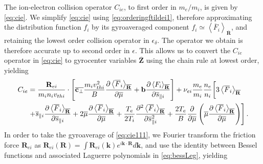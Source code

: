 
The ion-electron collision operator $C_{ie}$, to first order in $m_e/m_i$, is given by \cref{eq:cie}.
%
We simplify \cref{eq:cie} using \cref{eq:orderingftildei1}, therefore approximating the distribution function $f_i$ by its gyroaveraged component $f_i \simeq \left<\overline F_i\right>_{\overline{\mathbf R}}$, and retaining the lowest order collision operator in $\epsilon_\delta$.
%
The operator we obtain is therefore accurate up to second order in $\epsilon$. 
%
This allows us to convert the $C_{ie}$ operator in \cref{eq:cie} to gyrocenter variables $\overline{\mathbf Z}$ using the chain rule at lowest order, yielding
%
\begin{align}
    C_{ie} &= \frac{\mathbf R_{ei}}{m_i n_i v_{th i }}\cdot\left[\overline {\mathbf c_\perp} \frac{m_i v_{thi}^2}{B}\frac{\partial \left< \overline F_i \right>_{\overline{\mathbf R}}}{\partial \overline \mu}+\mathbf b \frac{\partial \left< F_i \right>_{\overline{\mathbf R}}}{\partial \overline s_{\parallel i}}\right]+\nu_{ei}\frac{m_e}{m_i}\frac{n_e}{n_i}\bigg[3 \left< \overline F_i \right>_{\overline{\mathbf R}}\nonumber\\
    &\left. + \overline s_{\parallel i} \frac{\partial \left< \overline F_i \right>_{\overline{\mathbf R}}}{\partial \overline s_{\parallel i}} +2\overline \mu \frac{\partial \left< \overline F_i \right>_{\overline{\mathbf R}}}{\partial \overline \mu}+ \frac{T_e}{2T_i}\frac{\partial^2 \left< \overline F_i \right>_{\overline{\mathbf R}}}{\partial \overline s_{\parallel i }^2}+\frac{2 T_e}{B} \frac{\partial}{\partial \overline \mu}\left(\overline \mu \frac{\partial \left< \overline F_i \right>_{\overline{\mathbf R}}}{\partial \overline \mu}\right)\right].
    \label{eq:cie111}
\end{align}
%
In order to take the gyroaverage of \cref{eq:cie111}, we Fourier transform the friction force $\mathbf R_{ei}$ as $\mathbf R_{ei}(\mathbf R) = \int \mathbf R_{ei}(\mathbf k)e^{i \mathbf k \cdot \mathbf R} d \mathbf k$, and use the identity between Bessel functions and associated Laguerre polynomials in \cref{eq:bessLeg}, yielding
%
